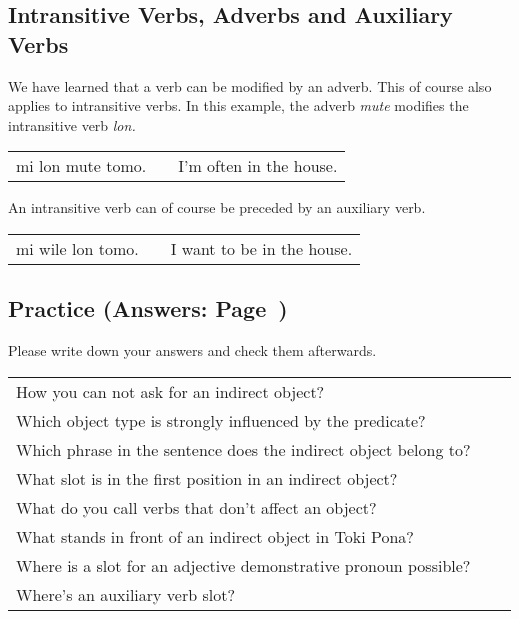 %
%
\newpage
%
\subsection*{Intransitive Verbs, Adverbs and Auxiliary Verbs}
%
%

We have learned that a verb can be modified by an adverb.
This of course also applies to intransitive verbs.
In this example, the adverb \textit{mute} modifies the intransitive verb \textit{lon.}

\begin{supertabular}{p{5,5cm}|ll}
    mi lon mute tomo. &  & I'm often in the house. \\
\end{supertabular}

An intransitive verb can of course be preceded by an auxiliary verb.

\begin{supertabular}{p{5,5cm}|ll}
    mi wile lon tomo. &  & I want to be in the house. \\
\end{supertabular}

%
\newpage
%
\subsection*{Practice (Answers: Page~\pageref{'indirect_objects'})}
%
Please write down your answers and check them afterwards.

\begin{supertabular}{p{5,5cm}|ll}
    How you can not ask for an indirect object?                      &  & \\ %
    Which object type is strongly influenced by the predicate?       &  & \\ %
    Which phrase in the sentence does the indirect object belong to? &  & \\ %
    What slot is in the first position in an indirect object?        &  & \\ %
    What do you call verbs that don't affect an object?              &  & \\ %
    What stands in front of an indirect object in Toki Pona?         &  & \\ %
    Where is a slot for an adjective demonstrative pronoun possible? &  & \\ %
    Where's an auxiliary verb slot?                                  &  & \\ %
\end{supertabular}

